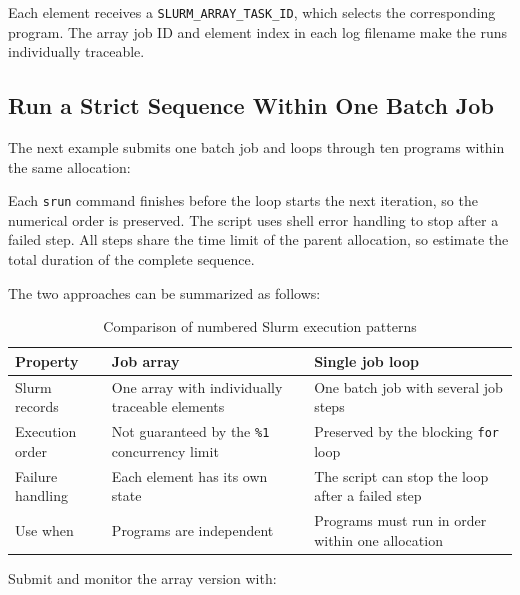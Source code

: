 \documentclass[11pt,oneside]{memoir}
\begin{document}


Each element receives a \texttt{SLURM\_ARRAY\_TASK\_ID}, which selects the corresponding program. The array job ID and element index in each log filename make the runs individually traceable.

\subsection{Run a Strict Sequence Within One Batch Job}
\label{subsec:single-job-loop}

The next example submits one batch job and loops through ten programs within the same allocation:



Each \texttt{srun} command finishes before the loop starts the next iteration, so the numerical order is preserved. The script uses shell error handling to stop after a failed step. All steps share the time limit of the parent allocation, so estimate the total duration of the complete sequence.

The two approaches can be summarized as follows:

\begin{table}[!htbp]
\centering
\caption{Comparison of numbered Slurm execution patterns}
\label{tab:sequential-slurm-patterns}
\begin{tabularx}{\textwidth}{l X X}
\toprule
\textbf{Property} & \textbf{Job array} & \textbf{Single job loop} \\
\midrule
Slurm records & One array with individually traceable elements & One batch job with several job steps \\
Execution order & Not guaranteed by the \texttt{\%1} concurrency limit & Preserved by the blocking \texttt{for} loop \\
Failure handling & Each element has its own state & The script can stop the loop after a failed step \\
Use when & Programs are independent & Programs must run in order within one allocation \\
\bottomrule
\end{tabularx}
\end{table}

Submit and monitor the array version with:
\end{document}
